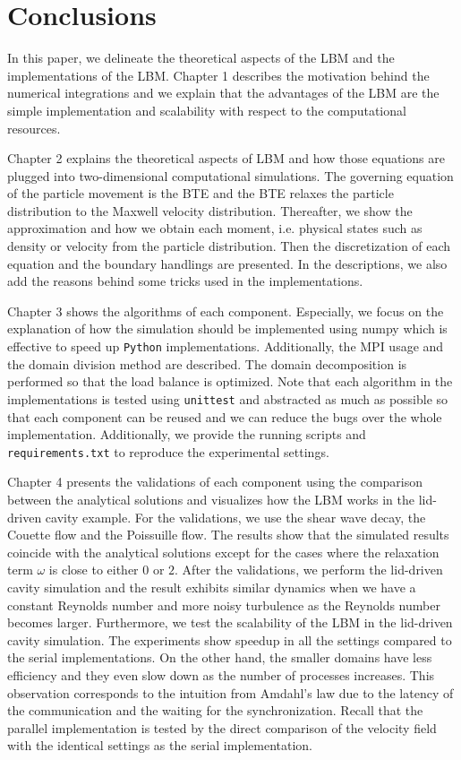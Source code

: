 \chapter{Conclusions}
\vspace{-8mm}
In this paper,
we delineate the theoretical aspects of the LBM
and the implementations of the LBM.
Chapter 1 describes the motivation behind the numerical integrations
and 
we explain that the advantages of the LBM
are the simple implementation
and scalability with respect to the computational
resources.

Chapter 2 explains the theoretical aspects of LBM
and how those equations are plugged into two-dimensional
computational simulations.
The governing equation of the particle movement is
the BTE and the BTE relaxes the particle distribution
to the Maxwell velocity distribution.
Thereafter, we show the approximation and how we obtain each moment, i.e.
physical states such as density or velocity
from the particle distribution.
Then the discretization of each equation and
the boundary handlings are presented.
In the descriptions, we also add the
reasons behind some tricks used in the implementations.

Chapter 3 shows the algorithms of each component.
Especially, we focus on the explanation of how
the simulation should be implemented using numpy
which is effective to speed up {\tt Python} implementations.
Additionally, the MPI usage and the domain division method
are described.
The domain decomposition is performed so that the 
load balance is optimized.
Note that each algorithm in the implementations
is tested using {\tt unittest} and abstracted as much as possible
so that each component can be reused and we can reduce
the bugs over the whole implementation.
Additionally, we provide the running scripts and {\tt requirements.txt}
to reproduce the experimental settings.

Chapter 4 presents the validations of each component
using the comparison between the analytical solutions
and visualizes how the LBM works in the lid-driven cavity
example.
For the validations, we use the shear wave decay, 
the Couette flow and the Poissuille flow.
The results show that the simulated results
coincide with the analytical solutions except for
the cases where the relaxation term $\omega$ is 
close to either $0$ or $2$.
After the validations, we perform the lid-driven cavity simulation
and the result exhibits similar dynamics when we have a constant Reynolds number
and more noisy turbulence as the Reynolds number becomes larger.
Furthermore, we test the scalability of the LBM in the lid-driven cavity simulation.
The experiments show speedup in all the settings compared to
the serial implementations.
On the other hand, the smaller domains have
less efficiency and they even slow down as the number of processes increases.
This observation corresponds to the intuition from Amdahl's law due to
the latency of the communication and the waiting for the synchronization.
Recall that the parallel implementation is tested by the direct
comparison of the velocity field with the identical settings
as the serial implementation. 
